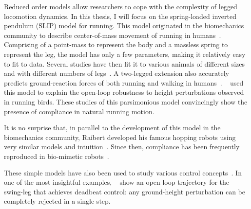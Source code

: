Reduced order models allow researchers to cope with the complexity of legged locomotion dynamics. 
In this thesis, I will focus on the spring-loaded inverted pendulum (SLIP) model for running. This model originated in the biomechanics community to describe center-of-mass movement of running in humans~\cite{blickhan1989spring}. Comprising of a point-mass to represent the body and a massless spring to represent the leg, the model has only a few parameters, making it relatively easy to fit to data.
Several studies have then fit it to various animals of different sizes and with different numbers of legs~\cite{blickhan1993similarity,daley2006running,jindrich2002dynamic}. A two-legged extension also accurately predicts ground-reaction forces of both running and walking in humans~\cite{geyer2006compliant}. ~\textcite{daley2006running} used this model to explain the open-loop robustness to height perturbations observed in running birds.
These studies of this parsimonious model convincingly show the presence of compliance in natural running motion. \par
It is no surprise that, in parallel to the development of this model in the biomechanics community, Raibert developed his famous hopping robots using very similar models and intuition~\cite[cf. Figure 2.5]{raibert1986legged}.
Since then, compliance has been frequently reproduced in bio-mimetic robots~\cite{sprowitz2013cheetah,buchli2006resonance,hubicki2016atrias,hutter2016anymal,kenneally2016design,ramos2018facilitating}. \par
These simple models have also been used to study various control concepts~\cite{piovan2013two,cnops2015basin,piovan2015reachability}. In one of the most insightful examples, ~\textcite{wu20133} show an open-loop trajectory for the swing-leg that achieves deadbeat control: any ground-height perturbation can be completely rejected in a single step. \par 
